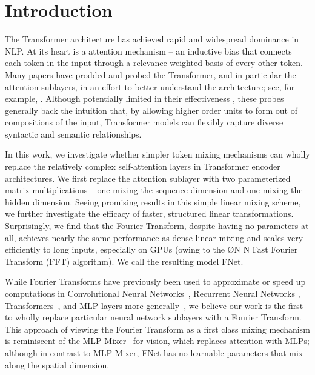 \section{Introduction}
\label{sec:introduction}

The Transformer architecture \citep{vaswani2017attention} has achieved rapid and widespread dominance in NLP. At its heart is a attention mechanism -- an inductive bias that connects each token in the input through a relevance weighted basis of every other token. Many papers have prodded and probed the Transformer, and in particular the attention sublayers, in an effort to better understand the architecture; see, for example, \citet{tenney-etal-2019-bert, vig-belinkov-2019-analyzing, clark-etal-2019-bert, voita-etal-2019-analyzing}. Although potentially limited in their effectiveness \citep{hewitt-liang-2019-designing}, these probes generally back the intuition that, by allowing higher order units to form out of compositions of the input, Transformer models can flexibly capture diverse syntactic and semantic relationships. 

In this work, we investigate whether simpler token mixing mechanisms can wholly replace the relatively complex self-attention layers in Transformer encoder architectures. We first replace the attention sublayer with two parameterized matrix multiplications -- one mixing the sequence dimension and one mixing the hidden dimension. Seeing promising results in this simple linear mixing scheme, we further investigate the efficacy of faster, structured linear transformations. Surprisingly, we find that the Fourier Transform, despite having no parameters at all, achieves nearly the same performance as dense linear mixing and scales very efficiently to long inputs, especially on GPUs (owing to the \O{N \log N} Fast Fourier Transform (FFT) algorithm). We call the resulting model FNet. 

While Fourier Transforms have previously been used to approximate or speed up computations in Convolutional Neural Networks~\citep{el2004fast, mathieu2014fast, highlander2016very, pratt2017fcnn, lin2018fft, chitsaz2020acceleration, goldberg2020rethinking}, Recurrent Neural Networks \citep{koplon1997using, zhang2000forenet, zhang2018learning},  Transformers~\citep{choromanski2020masked, tamkin2020language}, and MLP layers more generally~\citep{cheng2015exploration, moczulski2015acdc, sindhwani2015structured}, we believe our work is the first to wholly replace particular neural network sublayers with a Fourier Transform. This approach of viewing the Fourier Transform as a first class mixing mechanism is reminiscent of the MLP-Mixer~\citep{tolstikhin2021mlp} for vision, which replaces attention with MLPs; although in contrast to MLP-Mixer, FNet has no learnable parameters that mix along the spatial dimension.

